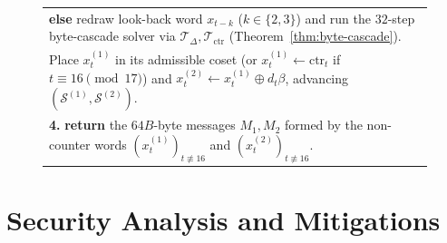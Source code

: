 \documentclass[11pt,a4paper]{article}
\theoremstyle{definition}
\theoremstyle{remark}
\begin{document}
\begin{figure}[t]
\begin{tabular}{@{}p{}@{}}
\hspace*{3.6em} \textbf{else} redraw look-back word $x_{t-k}$ ($k \in \{2, 3\}$) and run the $32$-step byte-cascade solver via $\mathcal{T}_{\Delta}, \mathcal{T}_{\mathrm{ctr}}$ (Theorem~\ref{thm:byte-cascade}). \\
\hspace*{1.8em} Place $x_t^{(1)}$ in its admissible coset (or $x_t^{(1)} \leftarrow \mathrm{ctr}_t$ if $t \equiv 16 \pmod{17}$) and $x_t^{(2)} \leftarrow x_t^{(1)} \oplus d_t \beta$, advancing $(\mathcal{S}^{(1)}, \mathcal{S}^{(2)})$. \\
\textbf{4.} \textbf{return} the $64 B$-byte messages $M_1, M_2$ formed by the non-counter words $(x_t^{(1)})_{t \not\equiv 16}$ and $(x_t^{(2)})_{t \not\equiv 16}$. \\
\bottomrule
\end{tabular}
\end{figure}

\section{Security Analysis and Mitigations}
\label{sec:diagnosis}
\end{document}
